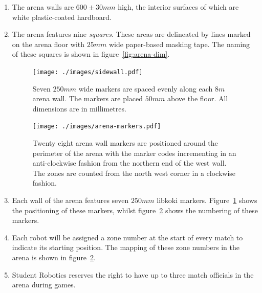 \begin{enumerate}
\item The arena walls are $600\pm30mm$ high, the interior surfaces of which are white plastic-coated hardboard.

\item The arena features nine \textit{squares}.
      These areas are delineated by lines marked on the arena floor with $25mm$ wide paper-based masking tape.
      The naming of these squares is shown in figure~\ref{fig:arena-dim}.

\begin{figure}
  \centering
  \texttt{[image: ./images/sidewall.pdf]}
  \caption{Seven $250mm$ wide markers are spaced evenly along each $8m$ arena wall.
           The markers are placed $50mm$ above the floor.
	   All dimensions are in millimetres.}
  \label{fig:arena-wall}
\end{figure}

\begin{figure}
  \centering
  \texttt{[image: ./images/arena-markers.pdf]}
  \caption{Twenty eight arena wall markers are positioned around the perimeter of the arena with the marker codes incrementing in an anti-clockwise fashion from the northern end of the west wall.
           The zones are counted from the north west corner in a clockwise fashion.}
  \label{fig:arena-zones}
\end{figure}

\item Each wall of the arena features seven $250mm$ libkoki markers.
      Figure~\ref{fig:arena-wall} shows the positioning of these markers, whilst figure~\ref{fig:arena-zones} shows the numbering of these markers.

\item Each robot will be assigned a zone number at the start of every match to indicate its starting position.
      The mapping of these zone numbers in the arena is shown in figure~\ref{fig:arena-zones}.

\item Student Robotics reserves the right to have up to three match officials in the arena during games.

\end{enumerate}


